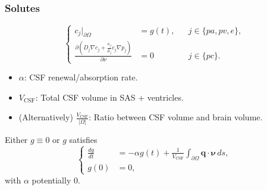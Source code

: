 \documentclass{article}
\theoremstyle{definition}
\theoremstyle{plain}
\theoremstyle{remark}
\begin{document}
\subsubsection*{Solutes}
\begin{equation*}
    \left\{
    \begin{aligned}
        c_j \big|_{\partial \Omega} &=  g(t), && j\in\{pa,pv,e \}, \label{eq:Dirichlet} \\
        \frac{\partial\left( D_j \nabla c_j + \frac{\kappa_j}{\mu_j}c_j \nabla p_j\right)}{\partial \nu}  &= 0 && j \in \{pc\}.
    \end{aligned}
    \right.
\end{equation*}
\begin{itemize}
    \item \( \alpha \): CSF renewal/absorption rate.
    \item \( V_{\text{CSF}} \): Total CSF volume in SAS + ventricles. 
        \item (Alternatively) \( \frac{V_{\text{CSF}}}{\lvert \Omega \rvert}\): Ratio between CSF volume and brain volume. 
\end{itemize}
Either \( g \equiv 0 \) or \( g \) satisfies
\begin{equation}
    \left\{
    \begin{aligned}
        \frac{dg}{dt} &= - \alpha g(t)  + \frac{1}{V_\text{CSF}} \int_{\partial \Omega}  \mathbf{q} \cdot\pmb{\nu}\,ds, \\
        g(0) &= 0,
    \end{aligned}
    \right.
\end{equation}
with \( \alpha \) potentially 0.
\end{document}
